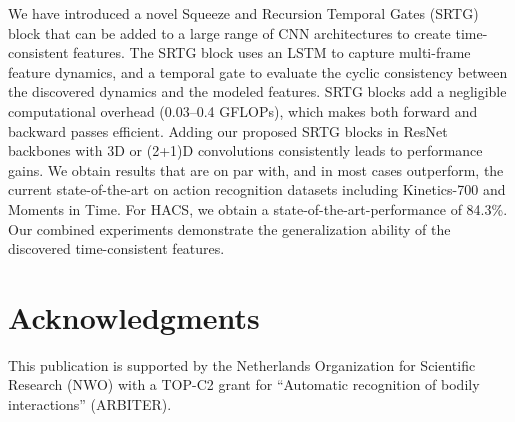 \documentclass[final,5p,times,twocolumn]{elsarticle}
\begin{document}
We have introduced a novel Squeeze and Recursion Temporal Gates (SRTG) block that can be added to a large range of CNN architectures to create time-consistent features. The SRTG block uses an LSTM to capture multi-frame feature dynamics, and a temporal gate to evaluate the cyclic consistency between the discovered dynamics and the modeled features. SRTG blocks add a negligible computational overhead (0.03--0.4 GFLOPs), which makes both forward and backward passes efficient. Adding our proposed SRTG blocks in ResNet backbones with 3D or (2+1)D convolutions consistently leads to performance gains.
We obtain results that are on par with, and in most cases outperform, the current state-of-the-art on action recognition datasets including Kinetics-700 and Moments in Time. For HACS, we obtain a state-of-the-art-performance of 84.3\%. Our combined experiments demonstrate the generalization ability of the discovered time-consistent features.


\section{Acknowledgments}
\label{sec:acknowledgments}
This publication is supported by the Netherlands Organization for Scientific Research (NWO) with a TOP-C2 grant for “Automatic recognition of bodily interactions” (ARBITER).



\end{document}
